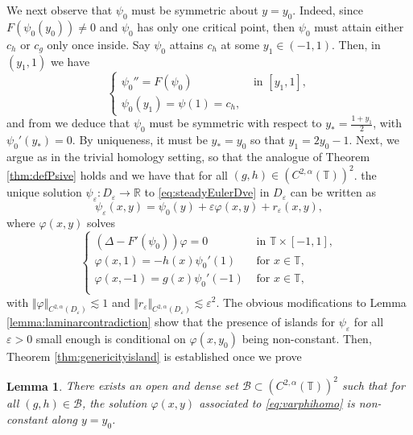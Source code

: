 \documentclass[11pt,reqno]{amsproc}
\newcommand{\R}{\mathbb{R}}
\newcommand{\ve}{\varepsilon}
\numberwithin{equation}{section}
\numberwithin{theorem}{section}
\numberwithin{prop}{section}
\numberwithin{cor}{section}
\newtheorem{lemma}{Lemma}
\numberwithin{lemma}{section}
\theoremstyle{remark}
\theoremstyle{definition}
\begin{document}
We next observe that $\psi_0$ must be symmetric about $y=y_0$. Indeed, since $F(\psi_0(y_0))\neq 0$ and $\psi_0$ has only one critical point, then $\psi_0$ must attain either $c_h$ or $c_g$ only once inside. Say $\psi_0$ attains $c_h$ at some $y_1\in (-1,1)$. Then, in $(y_1,1)$ we have
\begin{equation}
\begin{cases}
\psi_0'' = F(\psi_0) & \text{ in } [y_1,1], \\
\psi_0(y_1)=\psi(1)=c_h, & 
\end{cases}
\end{equation}
and from \cite[Theorem 2.2]{bcn97} we deduce that $\psi_0$ must be symmetric with respect to $y_*=\frac{1+y_1}{2}$, with $\psi_0'(y_*)=0$. By uniqueness, it must be $y_*=y_0$ so that $y_1=2y_0-1$. Next, we argue as in the trivial homology setting, so that the analogue of Theorem \ref{thm:defPsive} holds and we have that for all $(g,h)\in (C^{2,\alpha}(\mathbb{T}))^2$. the unique solution $\psi_\ve:D_\ve\rightarrow \R$ to \eqref{eq:steadyEulerDve} in $D_\ve$ can be written as
\begin{equation}
\psi_\ve(x,y) = {\psi_0}(y) + \ve {\varphi}(x,y) + r_\ve(x,y),
\end{equation}
where $\varphi(x,y)$ solves
\begin{equation}\label{eq:varphihomo}
\begin{cases}
\left(\Delta-F'(\psi_0)\right)\varphi = 0 & \text{ in } \mathbb{T}\times[-1,1], \\
\varphi(x,1)= -h(x)\psi_0'(1) & \text{ for } x\in \mathbb{T}, \\
\varphi(x,-1)= g(x)\psi_0'(-1) & \text{ for } x\in\mathbb{T}, \\
\end{cases}
\end{equation}
with $\Vert {\varphi} \Vert_{C^{2,\alpha}(D_\ve)}\lesssim 1$ and $\Vert r_\ve \Vert_{C^{2,\alpha}(D_\ve)}\lesssim \ve^2$.  The obvious modifications to Lemma \ref{lemma:laminarcontradiction} show that the presence of islands for $\psi_\ve$ for all $\ve>0$ small enough is conditional on $\varphi(x,y_0)$ being non-constant. Then, Theorem \ref{thm:genericityisland} is established once we prove
\begin{lemma}\label{lemma:genericityislandnontrivialhom}
There exists an open and dense set $\mathcal{B}\subset (C^{2,\alpha}(\mathbb{T}))^2$ such that for all $(g,h)\in \mathcal{B}$, the solution $\varphi(x,y)$ associated to \eqref{eq:varphihomo} is non-constant along $y=y_0$.
\end{lemma}
\end{document}
